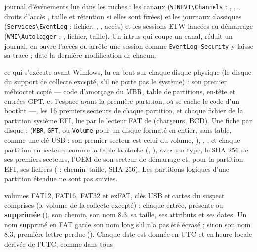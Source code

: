 \documentclass[11pt,a4paper,oneside]{report}
\begin{document}
\begin{description}[style=nextline,leftmargin=1.2em]
        journal d'événements lue dans les ruches : les canaux
        (\texttt{WINEVT\textbackslash Channels} : ,
        , , droits d'accès
        , taille et rétention si elles sont fixées) et les
        journaux classiques (\texttt{Services\textbackslash EventLog} :
        fichier, , , accès) et les sessions
        ETW lancées au démarrage (\texttt{WMI\textbackslash Autologger} :
        , fichier, taille). Un intrus qui coupe un canal, réduit
        un journal, en ouvre l'accès ou arrête une session comme
        \texttt{EventLog-Security} y laisse sa trace ;  date la dernière modification de chacun.
  \item[\fichier{boot\_records.json}] ce qui s'exécute avant Windows, lu en
        brut sur chaque disque physique (le disque du support de collecte
        excepté, s'il ne porte pas le système) : son premier mébioctet copié — code d'amorçage du MBR, table
        de partitions, en-tête et entrées GPT, et l'espace avant la première
        partition, où se cache le code d'un bootkit —, les 16 premiers
        secteurs de chaque partition, et chaque fichier de la partition
        système EFI, lue par le lecteur FAT de \wac{} (chargeurs, BCD). Une
        fiche par disque :  (\texttt{MBR},
        \texttt{GPT}, ou \texttt{Volume} pour un disque formaté en entier,
        sans table, comme une clé USB : son premier secteur est celui du
        volume, ), , , et chaque
        partition en secteurs comme la table la stocke (,
        ), avec son type, le SHA-256 de ses premiers secteurs,
        l'OEM de son secteur de démarrage et, pour la partition EFI, ses
        fichiers ( : chemin, taille, SHA-256). Les partitions
        logiques d'une partition étendue ne sont pas suivies.
  \item[\fichier{fat\_volumes.json}] volumes FAT12, FAT16, FAT32 et exFAT, clés
        USB et cartes du suspect comprises (le volume de la collecte excepté) :
        chaque entrée, présente ou \textbf{supprimée} (), son
        chemin, son nom 8.3, sa taille, ses attributs et ses dates. Un nom
        supprimé en FAT garde son nom long s'il n'a pas été écrasé ; sinon son
        nom 8.3, première lettre perdue (). Chaque date
        est donnée en UTC et en heure locale dérivée de l'UTC, comme dans tous

\end{description}
\end{document}

